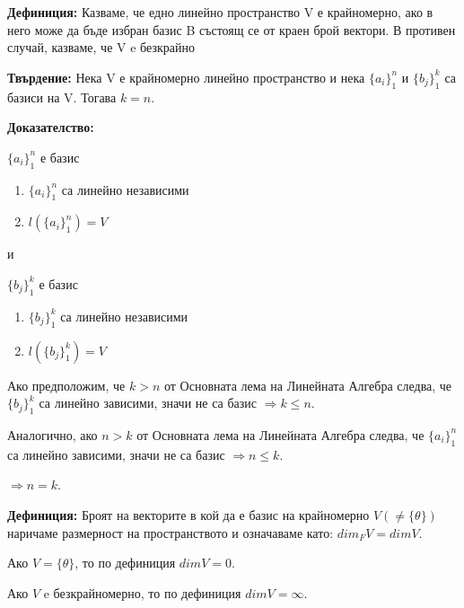 \documentclass[fleqn,12pt]{article}
\begin{document}
\begin{flushleft}
    \vspace{5mm}
    
    \textbf{Дефиниция:} Казваме, че едно линейно пространство V е крайномерно, ако в него може да бъде избран базис B състоящ се от краен брой вектори. В противен случай, казваме, че V e безкрайно

    \vspace{5mm}
    
    \textbf{Твърдение:} Нека V е крайномерно линейно пространство и нека $\{ a_i \}_1^n $ и $\{ b_j \}_1^k $ са базиси на V. Тогава $ k = n $.

    \vspace{5mm}
    
        \textbf{Доказателство:}

        $ \{a_i\}_1^n $ е базис
        \begin{enumerate}
            \item $\{a_i\}_1^n $ са линейно независими
            \item $ l(\{a_i\}_1^n) = V $
        \end{enumerate}

        и

        $ \{b_j\}_1^k $ е базис
        \begin{enumerate}
            \item $\{b_j\}_1^k $ са линейно независими
            \item $ l(\{b_j\}_1^k) = V $
        \end{enumerate}

        Ако предположим, че $k > n $ от Основната лема на Линейната Алгебра следва, че $ \{b_j\}_1^k $ са линейно зависими, значи не са базис $\Rightarrow k \leq n $.

        Аналогично, ако $n > k $ от Основната лема на Линейната Алгебра следва, че $ \{a_i\}_1^n $ са линейно зависими, значи не са базис $\Rightarrow n \leq k $.

        $\Rightarrow n = k$. \square


    
    \vspace{5mm}
    
    \textbf{Дефиниция:} Броят на векторите в кой да е базис на крайномерно $V ( \neq \{\theta\}) $ наричаме размерност на пространството и означаваме като: $dim_F V = dimV$.

    Ако $V = \{\theta\} $, то по дефиниция $ dimV = 0$.

    Ако $V$ e безкрайномерно, то по дефиниция $ dimV = \infty$.


\end{flushleft}
\end{document}
